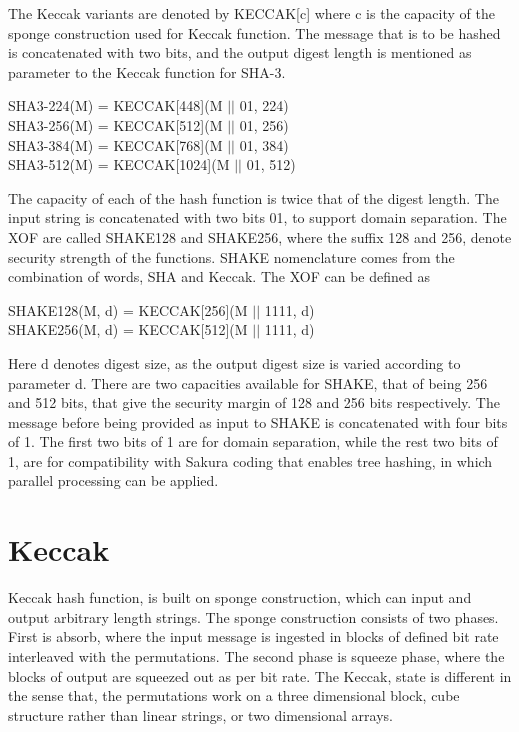 The Keccak variants are denoted by KECCAK[c] where c is the capacity of the sponge construction used for Keccak
function. The message that is to be hashed is concatenated with two bits, and the output digest length is mentioned
as parameter to the Keccak function for SHA-3.
\begin{center}
SHA3-224(M) = KECCAK[448](M $\vert \vert$ 01, 224) \\
SHA3-256(M) = KECCAK[512](M $\vert \vert$ 01, 256) \\
SHA3-384(M) = KECCAK[768](M $\vert \vert$ 01, 384) \\
SHA3-512(M) = KECCAK[1024](M $\vert \vert$ 01, 512)
\end{center}
The capacity of each of the hash function is twice that of the digest length. The input string is concatenated with two
bits 01, to support domain separation. The XOF are called SHAKE128 and SHAKE256, where the suffix 128 and 256, denote
security strength of the functions. SHAKE nomenclature comes from the combination of words, SHA and Keccak. The XOF
can be defined as 
\begin{center}
SHAKE128(M, d) = KECCAK[256](M $\vert \vert$ 1111, d) \\
SHAKE256(M, d) = KECCAK[512](M $\vert \vert$ 1111, d)
\end{center}
Here d denotes digest size, as the output digest size is varied according to parameter d. There are two capacities available
for SHAKE, that of being 256 and 512 bits, that give the security margin of 128 and 256 bits respectively. The message before
being provided as input to SHAKE is concatenated  with four bits of 1. The first two bits of 1 are for domain separation,
while the rest two bits of 1, are for compatibility with Sakura coding that enables tree hashing, in which parallel
processing can be applied.

\section{Keccak}
Keccak hash function, is built on sponge construction, which can input and output arbitrary length strings. The sponge
construction consists of two phases. First is absorb, where the input message is ingested in blocks of defined bit rate interleaved
with the permutations. The second phase is squeeze phase, where the blocks of output are squeezed out as per bit rate. 
The Keccak, state is different in the sense that, the permutations work on a three dimensional block, cube
structure rather than linear strings, or two dimensional arrays.

